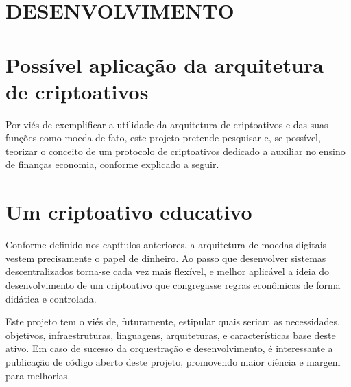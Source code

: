 \section*{DESENVOLVIMENTO}

\section*{Possível aplicação da arquitetura de criptoativos}

Por viés de exemplificar a utilidade da arquitetura de criptoativos e das suas funções como moeda de fato, este projeto pretende pesquisar e, se possível, teorizar o conceito de um protocolo de criptoativos dedicado a auxiliar no ensino de finanças economia, conforme explicado a seguir.

\section*{Um criptoativo educativo}
\label{sec:educativo}

Conforme definido nos capítulos anteriores, a arquitetura de moedas digitais vestem precisamente o papel de dinheiro. Ao passo que desenvolver sistemas descentralizados torna-se cada vez mais flexível, e melhor aplicável a ideia do desenvolvimento de um criptoativo que congregasse regras econômicas de forma didática e controlada.

Este projeto tem o viés de, futuramente, estipular quais seriam as necessidades, objetivos, infraestruturas, linguagens, arquiteturas, e características base deste ativo. Em caso de sucesso da orquestração e desenvolvimento, é interessante a publicação de código aberto deste projeto, promovendo maior ciência e margem para melhorias.








